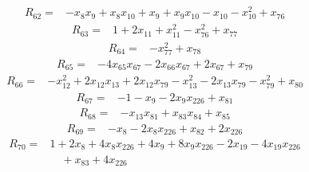 \begin{equation*}\begin{split}
R_{62}={}&-x_{8} x_{9} + x_{8} x_{10} + x_{9} + x_{9} x_{10} - x_{10} - x_{10}^{2} + x_{76}
\end{split}\end{equation*}
\begin{equation*}\begin{split}
R_{63}={}&1 + 2x_{11} + x_{11}^{2} - x_{76}^{2} + x_{77}
\end{split}\end{equation*}
\begin{equation*}\begin{split}
R_{64}={}&-x_{77}^{2} + x_{78}
\end{split}\end{equation*}
\begin{equation*}\begin{split}
R_{65}={}&-4x_{65} x_{67} - 2x_{66} x_{67} + 2x_{67} + x_{79}
\end{split}\end{equation*}
\begin{equation*}\begin{split}
R_{66}={}&-x_{12}^{2} + 2x_{12} x_{13} + 2x_{12} x_{79} - x_{13}^{2} - 2x_{13} x_{79} - x_{79}^{2} + x_{80}
\end{split}\end{equation*}
\begin{equation*}\begin{split}
R_{67}={}&-1 - x_{9} - 2x_{9} x_{226} + x_{81}
\end{split}\end{equation*}
\begin{equation*}\begin{split}
R_{68}={}&-x_{13} x_{81} + x_{83} x_{84} + x_{85}
\end{split}\end{equation*}
\begin{equation*}\begin{split}
R_{69}={}&-x_{8} - 2x_{8} x_{226} + x_{82} + 2x_{226}
\end{split}\end{equation*}
\begin{equation*}\begin{split}
R_{70}={}&1 + 2x_{8} + 4x_{8} x_{226} + 4x_{9} + 8x_{9} x_{226} - 2x_{19} - 4x_{19} x_{226}\\
&\quad + x_{83} + 4x_{226}
\end{split}\end{equation*}
